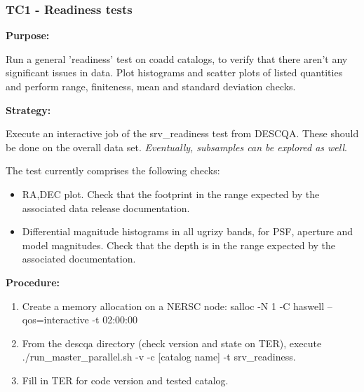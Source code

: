 \documentclass[12pt, a4paper]{article}
\begin{document}





\subsubsection{TC1 - Readiness tests}
\textbf{Purpose:} 

Run a general 'readiness' test on coadd catalogs, to verify that there aren't any significant issues in data. Plot histograms and scatter plots of listed quantities and perform range, finiteness, mean and standard deviation checks.

\textbf{Strategy:} 

Execute an interactive job of the srv\_readiness test from DESCQA. These should be done on the overall data set.  \textit{Eventually, subsamples can be explored as well}.

The test currently comprises the following checks:
\begin{itemize}
	\item RA,DEC plot. Check that the footprint in the range expected by the associated data release documentation.
	\item Differential magnitude histograms in all ugrizy bands, for PSF, aperture and model magnitudes. Check that the depth is in the range expected by the associated documentation.
\end{itemize}

\textbf{Procedure:} 

\begin{enumerate}
	\item Create a memory allocation on a NERSC node: salloc -N 1 -C haswell --qos=interactive -t 02:00:00
	\item From the descqa directory (check version and state on TER), execute ./run\_master\_parallel.sh -v -c [catalog name] -t srv\_readiness. 
	\item Fill in TER for code version and tested catalog.
\end{enumerate}
\end{document}
